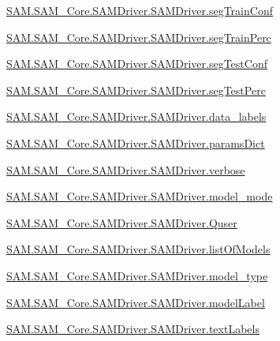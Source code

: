 \begin{DoxyCompactItemize}
\item 
\hyperlink{group__icubclient__SAM__Drivers_ga510653c29b923373a47faf252919d6cb}{S\+A\+M.\+S\+A\+M\+\_\+\+Core.\+S\+A\+M\+Driver.\+S\+A\+M\+Driver.\+seg\+Train\+Conf}
\item 
\hyperlink{group__icubclient__SAM__Drivers_gaf7748998c4b4347aaac0df1cc38a830c}{S\+A\+M.\+S\+A\+M\+\_\+\+Core.\+S\+A\+M\+Driver.\+S\+A\+M\+Driver.\+seg\+Train\+Perc}
\item 
\hyperlink{group__icubclient__SAM__Drivers_ga11f7d1112da1490998b9878d212d6255}{S\+A\+M.\+S\+A\+M\+\_\+\+Core.\+S\+A\+M\+Driver.\+S\+A\+M\+Driver.\+seg\+Test\+Conf}
\item 
\hyperlink{group__icubclient__SAM__Drivers_ga0cbeb9209124fba55cb56c5de40b7a63}{S\+A\+M.\+S\+A\+M\+\_\+\+Core.\+S\+A\+M\+Driver.\+S\+A\+M\+Driver.\+seg\+Test\+Perc}
\item 
\hyperlink{group__icubclient__SAM__Drivers_gac25896ed8992a4f3315b937f8a54613d}{S\+A\+M.\+S\+A\+M\+\_\+\+Core.\+S\+A\+M\+Driver.\+S\+A\+M\+Driver.\+data\+\_\+labels}
\item 
\hyperlink{group__icubclient__SAM__Drivers_ga462b640279c37475acc154525d327eeb}{S\+A\+M.\+S\+A\+M\+\_\+\+Core.\+S\+A\+M\+Driver.\+S\+A\+M\+Driver.\+params\+Dict}
\item 
\hyperlink{group__icubclient__SAM__Drivers_ga48cfefc6532ba606936b9fd7f3156da8}{S\+A\+M.\+S\+A\+M\+\_\+\+Core.\+S\+A\+M\+Driver.\+S\+A\+M\+Driver.\+verbose}
\item 
\hyperlink{group__icubclient__SAM__Drivers_gaa8e9a230b77bb0223043c14f711fb8a9}{S\+A\+M.\+S\+A\+M\+\_\+\+Core.\+S\+A\+M\+Driver.\+S\+A\+M\+Driver.\+model\+\_\+mode}
\item 
\hyperlink{group__icubclient__SAM__Drivers_gafa17acba2ab91a5988b535ab129694e7}{S\+A\+M.\+S\+A\+M\+\_\+\+Core.\+S\+A\+M\+Driver.\+S\+A\+M\+Driver.\+Quser}
\item 
\hyperlink{group__icubclient__SAM__Drivers_ga962b980991bc6ea994f32f2baf4266e6}{S\+A\+M.\+S\+A\+M\+\_\+\+Core.\+S\+A\+M\+Driver.\+S\+A\+M\+Driver.\+list\+Of\+Models}
\item 
\hyperlink{group__icubclient__SAM__Drivers_ga825f509582eecf9d63d742b9f47cf759}{S\+A\+M.\+S\+A\+M\+\_\+\+Core.\+S\+A\+M\+Driver.\+S\+A\+M\+Driver.\+model\+\_\+type}
\item 
\hyperlink{group__icubclient__SAM__Drivers_ga25e341fd0f6a6103844e8412ee7811a4}{S\+A\+M.\+S\+A\+M\+\_\+\+Core.\+S\+A\+M\+Driver.\+S\+A\+M\+Driver.\+model\+Label}
\item 
\hyperlink{group__icubclient__SAM__Drivers_ga56128df082b1160386c6d9857ef0fe38}{S\+A\+M.\+S\+A\+M\+\_\+\+Core.\+S\+A\+M\+Driver.\+S\+A\+M\+Driver.\+text\+Labels}

\end{DoxyCompactItemize}
